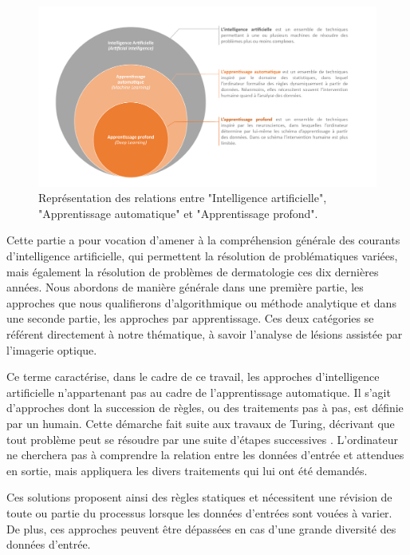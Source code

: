 \begin{figure}[H]
    \centering
    \includegraphics[width=\linewidth]{contents/chapter_3/resources/ia_overview.pdf}
    \caption{Représentation des relations entre "Intelligence artificielle", "Apprentissage automatique" et "Apprentissage profond".}
    \label{fig:ia_overview}
\end{figure}\par

Cette partie a pour vocation d’amener à la compréhension générale des courants d’intelligence artificielle, qui permettent la résolution de problématiques variées, mais également la résolution de problèmes de dermatologie ces dix dernières années. Nous abordons de manière générale dans une première partie, les approches que nous qualifierons d’algorithmique ou méthode analytique et dans une seconde partie, les approches par apprentissage. Ces deux catégories se référent directement à notre thématique, à savoir l’analyse de lésions assistée par l’imagerie optique.\par

Ce terme caractérise, dans le cadre de ce travail, les approches d’intelligence artificielle n’appartenant pas au cadre de l’apprentissage automatique. Il s’agit d’approches dont la succession de règles, ou des traitements pas à pas, est définie par un humain. Cette démarche fait suite aux travaux de Turing, décrivant que tout problème peut se résoudre par une suite d’étapes successives \cite{Turing1937}. L’ordinateur ne cherchera pas à comprendre la relation entre les données d’entrée et attendues en sortie, mais appliquera les divers traitements qui lui ont été demandés.\par

Ces solutions proposent ainsi des règles statiques et nécessitent une révision de toute ou partie du processus lorsque les données d’entrées sont vouées à varier. De plus, ces approches peuvent être dépassées en cas d’une grande diversité des données d’entrée.\par
 
